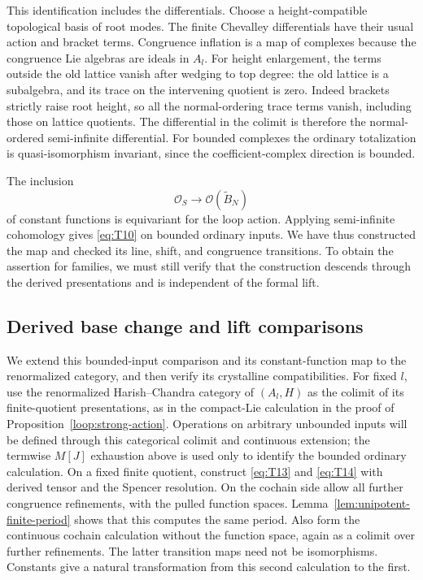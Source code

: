 This identification includes the differentials.  Choose a
height-compatible topological basis of root modes.  The finite
Chevalley differentials have their usual action and bracket terms.
Congruence inflation is a map of complexes because the congruence
Lie algebras are ideals in $A_l$.  For height enlargement, the terms
outside the old lattice vanish after wedging to top degree: the
old lattice is a subalgebra, and its trace on the intervening quotient
is zero.  Indeed brackets strictly raise root height, so all the
normal-ordering trace terms vanish, including those on lattice
quotients.  The differential in the colimit is therefore the
normal-ordered semi-infinite differential.  For bounded complexes
the ordinary totalization is quasi-isomorphism invariant, since the
coefficient-complex direction is bounded.

The inclusion
\[
 \mathcal O_S\longrightarrow\mathcal O(\widetilde B_N)
\]
of constant functions is equivariant for the loop action.  Applying
semi-infinite cohomology gives \eqref{eq:T10} on bounded ordinary
inputs.  We have thus constructed the map and checked its line,
shift, and congruence transitions.  To obtain the assertion for
families, we must still verify that the construction descends through
the derived presentations and is independent of the formal lift.

\subsection{Derived base change and lift comparisons}

We extend this bounded-input comparison and its constant-function
map to the renormalized category, and then verify its crystalline
compatibilities.
For fixed $l$, use the renormalized Harish--Chandra category of
$(A_l,H)$ as the colimit of its finite-quotient presentations, as in
the compact-Lie calculation in the proof of
Proposition~\ref{loop:strong-action}.  Operations on arbitrary
unbounded inputs will be defined through this categorical colimit
and continuous extension; the termwise $M[J]$ exhaustion above is
used only to identify the bounded ordinary calculation.
On a fixed finite
quotient, construct \eqref{eq:T13} and \eqref{eq:T14} with derived
tensor and the Spencer resolution.  On the cochain side allow all
further congruence refinements, with the pulled function spaces.
Lemma~\ref{lem:unipotent-finite-period} shows that this computes the
same period.  Also form the continuous cochain calculation without
the function space, again as a colimit over further refinements.
The latter transition maps need not be isomorphisms.  Constants give
a natural transformation from this second calculation to the first.

